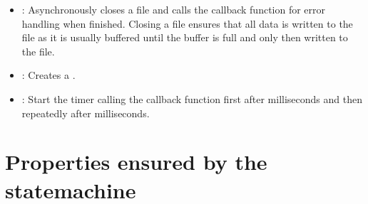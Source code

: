 \documentclass{report}
\begin{document}
\begin{itemize}
  \item {}: Asynchronously closes a file and calls the callback function for error handling when finished. Closing a file ensures that all data is written to the file as it is usually buffered until the buffer is full and only then written to the file.
  \item {}: Creates a .
  \item {}: Start the timer calling the callback function first after  milliseconds and then repeatedly after  milliseconds.
\end{itemize}

\section{Properties ensured by the statemachine}
\label{sec:properties ensured by the statemachine}
\end{document}
